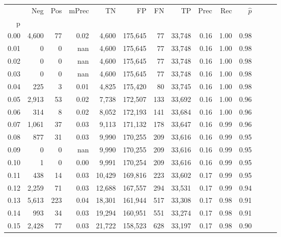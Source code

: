 \begin{tabular}{rrrrrrrrrrrrrr}
\toprule
{} &     Neg &    Pos & mPrec &       TN &       FP &      FN &      TP &  Prec &   Rec & $\hat{p}$ \\
p    &         &        &       &          &          &         &         &       &       &           \\
\midrule
0.00 &   4,600 &     77 &  0.02 &    4,600 &  175,645 &      77 &  33,748 &  0.16 &  1.00 &      0.98 \\
0.01 &       0 &      0 &   nan &    4,600 &  175,645 &      77 &  33,748 &  0.16 &  1.00 &      0.98 \\
0.02 &       0 &      0 &   nan &    4,600 &  175,645 &      77 &  33,748 &  0.16 &  1.00 &      0.98 \\
0.03 &       0 &      0 &   nan &    4,600 &  175,645 &      77 &  33,748 &  0.16 &  1.00 &      0.98 \\
0.04 &     225 &      3 &  0.01 &    4,825 &  175,420 &      80 &  33,745 &  0.16 &  1.00 &      0.98 \\
0.05 &   2,913 &     53 &  0.02 &    7,738 &  172,507 &     133 &  33,692 &  0.16 &  1.00 &      0.96 \\
0.06 &     314 &      8 &  0.02 &    8,052 &  172,193 &     141 &  33,684 &  0.16 &  1.00 &      0.96 \\
0.07 &   1,061 &     37 &  0.03 &    9,113 &  171,132 &     178 &  33,647 &  0.16 &  0.99 &      0.96 \\
0.08 &     877 &     31 &  0.03 &    9,990 &  170,255 &     209 &  33,616 &  0.16 &  0.99 &      0.95 \\
0.09 &       0 &      0 &   nan &    9,990 &  170,255 &     209 &  33,616 &  0.16 &  0.99 &      0.95 \\
0.10 &       1 &      0 &  0.00 &    9,991 &  170,254 &     209 &  33,616 &  0.16 &  0.99 &      0.95 \\
0.11 &     438 &     14 &  0.03 &   10,429 &  169,816 &     223 &  33,602 &  0.17 &  0.99 &      0.95 \\
0.12 &   2,259 &     71 &  0.03 &   12,688 &  167,557 &     294 &  33,531 &  0.17 &  0.99 &      0.94 \\
0.13 &   5,613 &    223 &  0.04 &   18,301 &  161,944 &     517 &  33,308 &  0.17 &  0.98 &      0.91 \\
0.14 &     993 &     34 &  0.03 &   19,294 &  160,951 &     551 &  33,274 &  0.17 &  0.98 &      0.91 \\
0.15 &   2,428 &     77 &  0.03 &   21,722 &  158,523 &     628 &  33,197 &  0.17 &  0.98 &      0.90 \\

\end{tabular}
